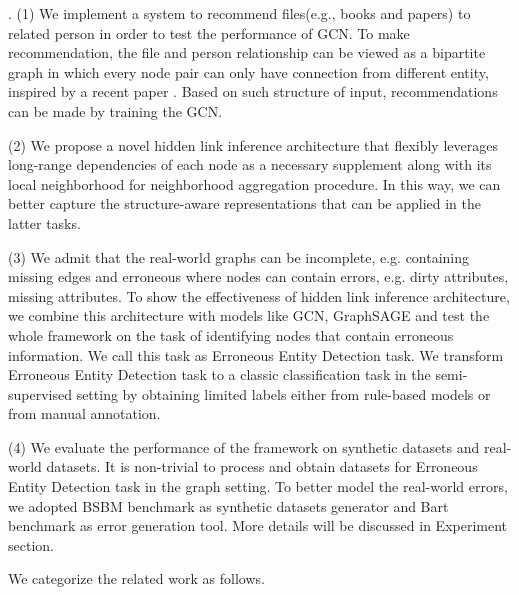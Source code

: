  . 
 (1) We implement a system to recommend files(e.g., books and papers) to related person in order to test the performance of GCN. To make recommendation, the file and person relationship can be viewed as a bipartite graph in which every node pair can only have connection from different entity, inspired by a recent paper \cite{pintest}. Based on such structure of input, recommendations can be made by training the GCN.
 
 \stab
 (2) We propose a novel hidden link inference architecture that flexibly leverages long-range dependencies of each node as a necessary supplement along with its local neighborhood for neighborhood aggregation procedure. In this way, we can better capture the structure-aware representations that can be applied in the latter tasks.
 
 \stab
 (3) We admit that the real-world graphs can be incomplete, e.g. containing missing edges and erroneous where nodes can contain errors, e.g. dirty attributes, missing attributes. 
 To show the effectiveness of hidden link inference architecture, we combine this architecture with models like GCN, GraphSAGE and test the whole framework on the task of identifying nodes that contain erroneous information. We call this task as Erroneous Entity Detection task. 
 We transform Erroneous Entity Detection task to a classic classification task in the semi-supervised setting by obtaining limited labels either from rule-based models or from manual annotation.
 
 \stab
 (4) We evaluate the performance of the framework on synthetic datasets and real-world datasets. It is non-trivial to process and obtain datasets for Erroneous Entity Detection task in the graph setting. To better model the real-world errors, we adopted BSBM benchmark as synthetic datasets generator and Bart benchmark as error generation tool. More details will be discussed in Experiment section.







 We categorize the related work as follows.

